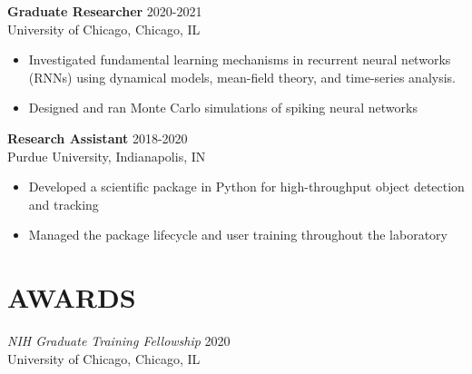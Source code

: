 \documentclass[margin, 10pt]{res} %
\begin{document}
\begin{resume}
\textbf{Graduate Researcher} \hfill 2020-2021 \\
University of Chicago, Chicago, IL

\begin{itemize} \itemsep -2pt %

\item Investigated fundamental learning mechanisms in recurrent neural networks (RNNs) using dynamical models, mean-field theory, and time-series analysis. 

\item Designed and ran Monte Carlo simulations of spiking neural networks 
 
\end{itemize}
 
\textbf{Research Assistant} \hfill 2018-2020\\
Purdue University, Indianapolis, IN
\begin{itemize} \itemsep -2pt

\item Developed a scientific package in Python for high-throughput object detection and tracking
\item Managed the package lifecycle and user training throughout the laboratory

\end{itemize}





\section{AWARDS}

{\sl NIH Graduate Training Fellowship} \hfill 2020 \\
University of Chicago, Chicago, IL


\end{resume}
\end{document}
